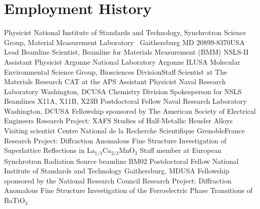 \documentclass[11pt]{moderncv}
\begin{document}
\maketitle

\section{Employment History}
%
        {Physicist}%
        {\small National Institute of Standards and Technology,\hfill\break
          Synchrotron Science Group, Material Measurement
          Laboratory}%
        {\small ~\hfill\break Gaithersburg MD 20899-8370}{USA}%
        { Lead Beamline Scientist, Beamline for Materials Measurement (BMM)
          NSLS-II
        }
%
        {Assistant Physicist}%
        {\small Argonne National Laboratory}
        {\small Argonne IL}{USA}%
        {Molecular Environmental Science Group,
          Biosciences Division\newline{}Staff Scientist at The Materials
          Research CAT at the APS
        }
%
%
        {Assistant Physicist}
        {\small Naval Research Laboratory}
        {\small Washington, DC}{USA}
        {Chemistry Division\newline{}
          Spokesperson for NSLS Beamlines X11A, X11B, X23B
        }
%
        {Postdoctoral Fellow}
        {\small Naval Research Laboratory}
        {\small Washington, DC}{USA}
        {Fellowship sponsored by The American Society of Electrical
          Engineers\newline{}
          Research Project: XAFS Studies of Half-Metallic Heusler Alloys
        }
%
        {Visiting scientist}
        {\small Centre National de la Recherche Scientifique}
        {\small Grenoble}{France}
        { Research Project: Diffraction Anomalous Fine Structure
          Investigation of Superlattice Reflections in
          La$_{1/3}$Ca$_{2/3}$MnO$_3$\newline{} 
          Staff member at European Synchrotron Radiation Source
          beamline BM02 
        }
%
        {Postdoctoral Fellow}
        {\small National Institute of Standards and Technology}
        {\small Gaithersburg, MD}{USA}
        {Fellowship sponsored by the National Research
          Council\newline{} 
          Research Project: Diffraction Anomalous Fine Structure
          Investigation 
          of the Ferroelectric Phase Transitions of BaTiO$_3$
        }
\end{document}
